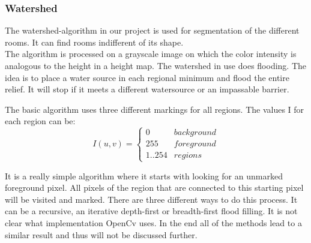 \subsubsection{Watershed}
\label{subsub:watershed}
The watershed-algorithm in our project is used for segmentation of the different rooms. It can find rooms indifferent of its shape.
\\
The algorithm is processed on a grayscale image on which the color intensity is analogous to the height in a height map. The watershed in use does flooding. The idea is to place a water source in each regional minimum and flood the entire relief. It will stop if it meets a different watersource or an impassable barrier.

The basic algorithm uses three different markings for all regions. The values I for each region can be:
\[I(u,v) = \begin{cases} 0 & background \\  255 & foreground \\ 1..254 & regions \end{cases} \]

It is a really simple algorithm where it starts with looking for an unmarked foreground pixel. All pixels of the region that are connected to this starting pixel will be visited and marked. There are three different ways to do this process. It can be a recursive, an iterative depth-first or breadth-first flood filling. It is not clear what implementation OpenCv uses. In the end all of the methods lead to a similar result and thus will not be discussed further. 

